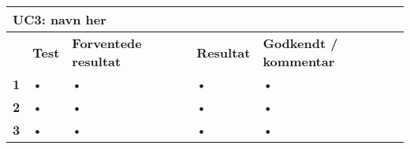 
\begin{longtable}{|p{5mm}|p{40mm}|p{40mm}|p{20mm}|p{25mm}|}
\hline 
\multicolumn{5}{|l|}{\textbf{UC3: navn her}} \\ 
\hline 
& \textbf{Test} & \textbf{Forventede resultat} & \textbf{Resultat} & \textbf{Godkendt / kommentar} \\ 
\hline 
\textbf{1}& • & • & • & • \\ 
\hline 
\textbf{2}& • & • & • & • \\ 
\hline 
\textbf{3}& • & • & • & • \\ 
\hline 
\end{longtable} 